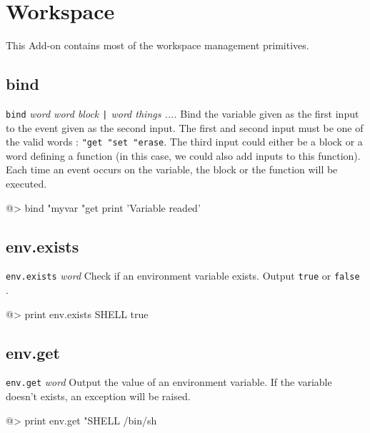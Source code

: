 \section{Workspace} 

This Add-on contains most of the workspace management primitives.

\subsection*{bind}  
 
{\tt bind} {\it word word block \verb+|+ word things ....} 
\newline\newline
Bind the variable given as the first input to the event given as the second input.  The first and second input must be one of the valid words : {\tt "get "set "erase}. The third input could either be a block or a word defining a function (in this case, we could also add inputs to this function). Each time an event occurs on the variable, the block or the function will be executed.
\begin{verbatimtab} 
@> bind "myvar "get {
	print 'Variable readed'	
}
\end{verbatimtab}

\subsection*{env.exists}  
 
{\tt env.exists} {\it word} 
\newline\newline
Check if an environment variable exists. Output {\tt true} or {\tt false
}.
\begin{verbatimtab} 
@> print env.exists SHELL
true
\end{verbatimtab}

\subsection*{env.get}  
 
{\tt env.get} {\it word}
\newline\newline
Output the value of an environment variable. If the variable doesn't exists,
an exception will be raised.
\begin{verbatimtab} 
@> print env.get "SHELL
/bin/sh
\end{verbatimtab}

